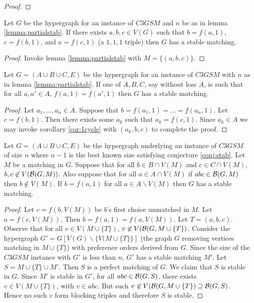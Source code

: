 \begin{definition}
\begin{proof}
\end{proof}
\begin{corollary}\label{cor:1cycle}
Let $G$ be the hypergraph for an instance of $C3GSM$ and $n$ be as in lemma \ref{lemma:partialstab}. If there exists $a,b,c \in V(G)$ such that $b = f(a,1)$, $c = f(b,1)$, and $a = f(c,1)$ (a $1,1,1$ triple) then $G$ has a stable matching.
\end{corollary}
\begin{proof}
Invoke lemma \ref{lemma:partialstab} with $M = \{(a,b,c)\}$.
\end{proof}
\begin{corollary}
Let $G=(A\cup B \cup C, E)$ be the hypergraph for an instance of $C3GSM$ with $n$ as in lemma \ref{lemma:partialstab}. If one of $A,B,C$, say without loss $A$, is such that for all $a,a' \in A$, $f(a,1) = f(a',1)$ then $G$ has a stable matching.
\end{corollary}
\begin{proof}
Let $a_1, \dots, a_n \in A$. Suppose that $b = f(a_1,1) =  \dots = f(a_n,1)$. Let $c = f(b,1)$. Then there exists some $a_k$ such that $a_k = f(c,1)$. Since $a_k \in A$ we may invoke corollary \ref{cor:1cycle} with $(a_k, b, c)$ to complete the proof.
\end{proof}
\begin{lemma} Let $G=(A\cup B \cup C, E)$ be the hypergraph underlying an instance of $C3GSM$ of size $n$ where $n-1$ is the best known size satisfying conjecture \ref{conj:stab}. Let $M$ be a matching in $G$. Suppose that for all $b\in B\cap V(M)$ and $c\in C\cap V(M)$, $b,c \not\in V(\mathcal{B}(G,M))$. Also suppose that for all $a \in A\cap V(M)$ if $abc \in \mathcal{B}(G,M)$ then $b \not\in V(M)$. If $b = f(a,1)$ for all $a \in A\backslash V(M)$ then $G$ has a stable matching.
\end{lemma}
\begin{proof}
Let $c = f(b,V(M))$ be $b$'s first choice unmatched in $M$. Let $a=f(c,V(M))$. Then $b = f(a,1) = f(a,V(M))$. Let $T = (a,b,c)$. Observe that for all $v \in V(M \cup \{T\})$,  $v \not\in V(\mathcal{B}(G,M\cup\{T\})$. Consider the hypergraph $G' = G[V(G)\backslash \{V(M \cup \{T\}\}]$ (the graph $G$ removing vertices matching in $M \cup\{T\}$) with preference orders derived from $G$. Since the size of the $C3GSM$ instance with $G'$ is less than $n$, $G'$ has a stable matching $M'$. Let $S = M \cup \{T\} \cup M'$. Then $S$ is a perfect matching of $G$. We claim that $S$ is stable in $G$. Since $M'$ is stable in $G'$, for all $abc \in \mathcal{B}(G,S)$, there exists $v \in V(M \cup \{T\})$, with $v \in abc$. But such $v \not\in V(\mathcal{B}(G,M\cup\{T\}) \supseteq \mathcal{B}(G,S)$. Hence no such $v$ form blocking triples and therefore $S$ is stable. 

\end{proof}
\end{definition}

